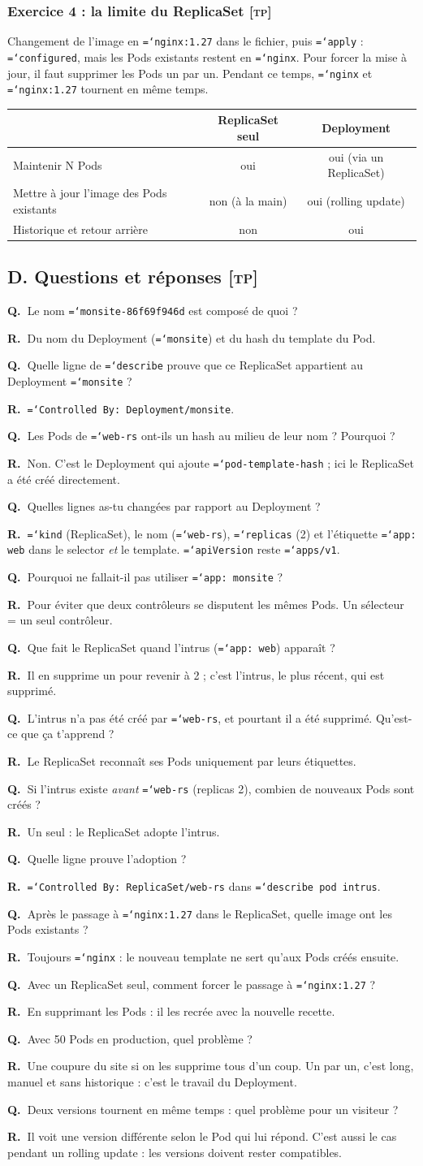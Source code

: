 \documentclass[11pt,a4paper]{article}
\newcommand{\cmd}[1]{\texttt{\hyphenchar\font=`\-#1}}
\newcommand{\tp}{\textsc{[tp]}}
\newcommand{\QR}[2]{\needspace{4\baselineskip}\par\noindent\textbf{Q.~}#1\par\nopagebreak\noindent\textbf{R.~}#2\par\medskip}
\newcommand{\partie}[1]{\needspace{9\baselineskip}\subsection*{#1}}
\newcommand{\exo}[1]{\needspace{8\baselineskip}\subsubsection*{#1}}
\begin{document}
\exo{Exercice 4 : la limite du ReplicaSet \tp}
Changement de l'image en \cmd{nginx:1.27} dans le fichier, puis \cmd{apply} : \cmd{configured}, mais les Pods existants restent en \cmd{nginx}.
Pour forcer la mise à jour, il faut supprimer les Pods un par un. Pendant ce temps, \cmd{nginx} et \cmd{nginx:1.27} tournent en même temps.

\begin{center}
\begin{tabularx}{0.92\linewidth}{@{}Xcc@{}}
\toprule
 & \textbf{ReplicaSet seul} & \textbf{Deployment} \\
\midrule
Maintenir N Pods & oui & oui (via un ReplicaSet) \\
Mettre à jour l'image des Pods existants & non (à la main) & oui (rolling update) \\
Historique et retour arrière & non & oui \\
\bottomrule
\end{tabularx}
\end{center}

\partie{D. Questions et réponses \tp}
\QR{Le nom \cmd{monsite-86f69f946d} est composé de quoi ?}{Du nom du Deployment (\cmd{monsite}) et du hash du template du Pod.}
\QR{Quelle ligne de \cmd{describe} prouve que ce ReplicaSet appartient au Deployment \cmd{monsite} ?}{\cmd{Controlled By: Deployment/monsite}.}
\QR{Les Pods de \cmd{web-rs} ont-ils un hash au milieu de leur nom ? Pourquoi ?}{Non. C'est le Deployment qui ajoute \cmd{pod-template-hash} ; ici le ReplicaSet a été créé directement.}
\QR{Quelles lignes as-tu changées par rapport au Deployment ?}{\cmd{kind} (ReplicaSet), le nom (\cmd{web-rs}), \cmd{replicas} (2) et l'étiquette \cmd{app: web} dans le selector \emph{et} le template. \cmd{apiVersion} reste \cmd{apps/v1}.}
\QR{Pourquoi ne fallait-il pas utiliser \cmd{app: monsite} ?}{Pour éviter que deux contrôleurs se disputent les mêmes Pods. Un sélecteur = un seul contrôleur.}
\QR{Que fait le ReplicaSet quand l'intrus (\cmd{app: web}) apparaît ?}{Il en supprime un pour revenir à 2 ; c'est l'intrus, le plus récent, qui est supprimé.}
\QR{L'intrus n'a pas été créé par \cmd{web-rs}, et pourtant il a été supprimé. Qu'est-ce que ça t'apprend ?}{Le ReplicaSet reconnaît ses Pods uniquement par leurs étiquettes.}
\QR{Si l'intrus existe \emph{avant} \cmd{web-rs} (replicas 2), combien de nouveaux Pods sont créés ?}{Un seul : le ReplicaSet adopte l'intrus.}
\QR{Quelle ligne prouve l'adoption ?}{\cmd{Controlled By: ReplicaSet/web-rs} dans \cmd{describe pod intrus}.}
\QR{Après le passage à \cmd{nginx:1.27} dans le ReplicaSet, quelle image ont les Pods existants ?}{Toujours \cmd{nginx} : le nouveau template ne sert qu'aux Pods créés ensuite.}
\QR{Avec un ReplicaSet seul, comment forcer le passage à \cmd{nginx:1.27} ?}{En supprimant les Pods : il les recrée avec la nouvelle recette.}
\QR{Avec 50 Pods en production, quel problème ?}{Une coupure du site si on les supprime tous d'un coup. Un par un, c'est long, manuel et sans historique : c'est le travail du Deployment.}
\QR{Deux versions tournent en même temps : quel problème pour un visiteur ?}{Il voit une version différente selon le Pod qui lui répond. C'est aussi le cas pendant un rolling update : les versions doivent rester compatibles.}
\end{document}
